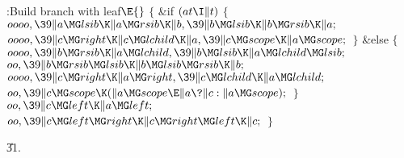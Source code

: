\B{}:Build branch with leaf\X${}\E{}$\6
${}\{{}$\1\6
\&{if} ${}(\\{at}\I\|t){}$\5
${}\{{}$\1\6
${}\\{oooo},\39\|a\MG\\{lsib}\K\|a\MG\\{rsib}\K\|b,\39\|b\MG\\{lsib}\K\|b\MG%
\\{rsib}\K\|a;{}$\6
${}\\{oooo},\39\|c\MG\\{right}\K\|c\MG\\{lchild}\K\|a,\39\|c\MG\\{scope}\K\|a%
\MG\\{scope};{}$\6
\4${}\}{}$\5
\2\&{else}\5
${}\{{}$\1\6
${}\\{oooo},\39\|b\MG\\{rsib}\K\|a\MG\\{lchild},\39\|b\MG\\{lsib}\K\|a\MG%
\\{lchild}\MG\\{lsib};{}$\6
${}\\{oo},\39\|b\MG\\{rsib}\MG\\{lsib}\K\|b\MG\\{lsib}\MG\\{rsib}\K\|b;{}$\6
${}\\{oooo},\39\|c\MG\\{right}\K\|a\MG\\{right},\39\|c\MG\\{lchild}\K\|a\MG%
\\{lchild};{}$\6
${}\\{oo},\39\|c\MG\\{scope}\K(\|a\MG\\{scope}\E\|a\?\|c:\|a\MG\\{scope});{}$\6
\4${}\}{}$\2\6
${}\\{oo},\39\|c\MG\\{left}\K\|a\MG\\{left};{}$\6
${}\\{oo},\39\|c\MG\\{left}\MG\\{right}\K\|c\MG\\{right}\MG\\{left}\K\|c;{}$\6
\4${}\}{}$\2\par
\U31.\fi

